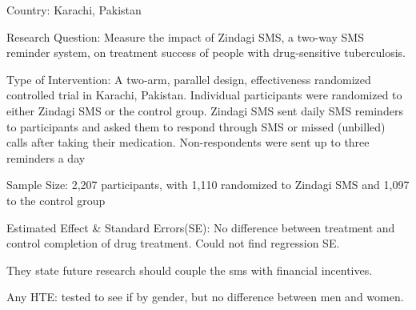 \documentclass{article}
\begin{document}
\hfill

Country: Karachi, Pakistan

\hfill

Research Question:
Measure the impact of Zindagi SMS, a two-way SMS reminder system, on treatment success of people with drug-sensitive tuberculosis.

\hfill

Type of Intervention: A two-arm, parallel design, effectiveness randomized controlled trial in Karachi, Pakistan. Individual participants were randomized to either Zindagi SMS or the control group. Zindagi SMS sent daily SMS reminders to participants and asked them to respond through SMS or missed (unbilled) calls after taking their medication. Non-respondents were sent up to three reminders a day

\hfill

Sample Size:  2,207 participants, with 1,110 randomized to Zindagi SMS and 1,097 to the control group
\hfill

Estimated Effect \& Standard Errors(SE): 
No difference between treatment and control completion of drug treatment. Could not find regression SE.



\hfill
They state future research should couple the sms with financial incentives.


\hfill

Any HTE: tested to see if by gender, but no difference between men and women.


 

\end{document}
